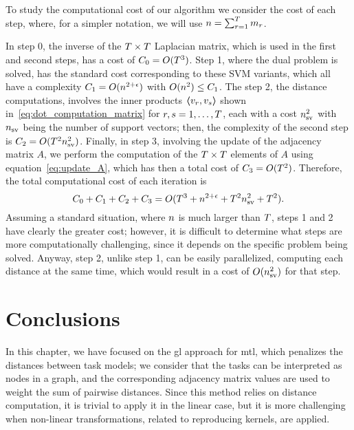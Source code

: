 To study the computational cost of our algorithm we consider the cost of each step, where, for a simpler notation, we will use $n = \sum_{r=1}^T m_r$.

In step 0, the inverse of the $T \times T$ Laplacian matrix, which is used in the first and second steps, has a cost of $C_0 = O(T^3)$.
%
Step 1, where the dual problem is solved, has the standard cost corresponding to these SVM variants, which all have a complexity $C_1 = O(n^{2+\epsilon})$ with $O(n^2) \leq C_1$.
%
The step 2, the distance computations, involves the inner products $\bm{\left\langle} v_r, v_s \bm{\right\rangle}$ shown in~\eqref{eq:dot_computation_matrix} for $r,s=1, \ldots, T$, each with a cost $n_{\text{sv}}^2$ with $n_{\text{sv}}$ being the number of support vectors; then, the complexity of the second step is $C_2 = O(T^2 n_\text{sv}^2)$.
%
Finally, in step 3, involving the update of the adjacency matrix $A$, we perform the computation of the $T \times T$ elements of $A$ using equation~\eqref{eq:update_A}, which has then a total cost of $C_3 = O(T^2)$.
%
Therefore, the total computational cost of each iteration is
$$ C_0 + C_1 + C_2 + C_3 = O(T^3 + n^{2+\epsilon} + T^2 n_\text{sv}^2 + T^2) .$$
%
Assuming a standard situation, where $n$ is much larger than $T$, steps 1 and 2 have clearly the greater cost; however, it is difficult to determine what steps are more computationally challenging, since it depends on the specific problem being solved. Anyway, step 2, unlike step 1, can be easily parallelized, computing each distance at the same time, which would result in a cost of $O(n_\text{sv}^2)$ for that step.




\section{Conclusions}\label{sec:conclusions_5}

In this chapter, we have focused on the \acrshort{gl} approach for \acrshort{mtl}, which penalizes the distances between task models; we consider that the tasks can be interpreted as nodes in a graph, and the corresponding adjacency matrix values are used to weight the sum of pairwise distances.
%
Since this method relies on distance computation, it is trivial to apply it in the linear case, but it is more challenging when non-linear transformations, related to reproducing kernels, are applied.

